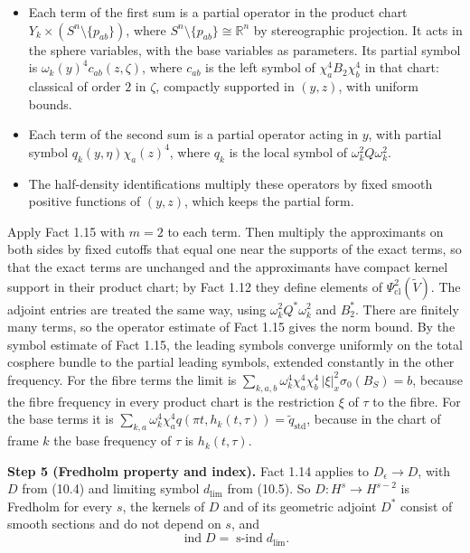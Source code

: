 \documentclass[
  11pt,
]{article}
\providecommand{\tightlist}{%
  \setlength{\itemsep}{0pt}\setlength{\parskip}{0pt}}
\begin{document}
\begin{itemize}
\tightlist
\item
  Each term of the first sum is a partial operator in the product chart
  \(Y_k\times(S^n\setminus\{p_{ab}\})\), where
  \(S^n\setminus\{p_{ab}\}\cong\mathbb R^n\) by stereographic
  projection. It acts in the sphere variables, with the base variables
  as parameters. Its partial symbol is \(\omega_k(y)^4c_{ab}(z,\zeta)\),
  where \(c_{ab}\) is the left symbol of \(\chi_a^4B_2\chi_b^4\) in that
  chart: classical of order \(2\) in \(\zeta\), compactly supported in
  \((y,z)\), with uniform bounds.
\item
  Each term of the second sum is a partial operator acting in \(y\),
  with partial symbol \(q_k(y,\eta)\chi_a(z)^4\), where \(q_k\) is the
  local symbol of \(\omega_k^2Q\omega_k^2\).
\item
  The half-density identifications multiply these operators by fixed
  smooth positive functions of \((y,z)\), which keeps the partial form.
\end{itemize}

Apply Fact 1.15 with \(m=2\) to each term. Then multiply the
approximants on both sides by fixed cutoffs that equal one near the
supports of the exact terms, so that the exact terms are unchanged and
the approximants have compact kernel support in their product chart; by
Fact 1.12 they define elements of \(\Psi^2_{\mathrm{cl}}(\tilde V)\).
The adjoint entries are treated the same way, using
\(\omega_k^2Q^*\omega_k^2\) and \(B_2^*\). There are finitely many
terms, so the operator estimate of Fact 1.15 gives the norm bound. By
the symbol estimate of Fact 1.15, the leading symbols converge uniformly
on the total cosphere bundle to the partial leading symbols, extended
constantly in the other frequency. For the fibre terms the limit is
\(\sum_{k,a,b}\omega_k^4\chi_a^4\chi_b^4\,|\xi|_x^2\sigma_0(B_S)=b\),
because the fibre frequency in every product chart is the restriction
\(\xi\) of \(\tau\) to the fibre. For the base terms it is
\(\sum_{k,a}\omega_k^4\chi_a^4q(\pi t,h_k(t,\tau))=\tilde q_{\mathrm{std}}\),
because in the chart of frame \(k\) the base frequency of \(\tau\) is
\(h_k(t,\tau)\).

\textbf{Step 5 (Fredholm property and index).} Fact 1.14 applies to
\(D_\epsilon\to D\), with \(D\) from (10.4) and limiting symbol
\(d_{\lim}\) from (10.5). So \(D:H^s\to H^{s-2}\) is Fredholm for every
\(s\), the kernels of \(D\) and of its geometric adjoint \(D^*\) consist
of smooth sections and do not depend on \(s\), and \[
\operatorname{ind}D=\operatorname{s-ind}d_{\lim}.
\tag{10.6}
\]
\end{document}
